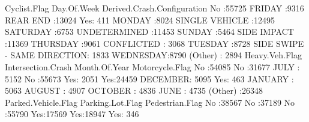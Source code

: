 \documentclass[11pt, a4paper]{article}
\begin{document}
\begin{Schunk}
\begin{Soutput}
 Cyclist.Flag    Day.Of.Week                Derived.Crash.Configuration
 No :55725    FRIDAY   :9316   REAR END                   :13024       
 Yes:  411    MONDAY   :8024   SINGLE VEHICLE             :12495       
              SATURDAY :6753   UNDETERMINED               :11453       
              SUNDAY   :5464   SIDE IMPACT                :11369       
              THURSDAY :9061   CONFLICTED                 : 3068       
              TUESDAY  :8728   SIDE SWIPE - SAME DIRECTION: 1833       
              WEDNESDAY:8790   (Other)                    : 2894       
 Heavy.Veh.Flag Intersection.Crash  Month.Of.Year   Motorcycle.Flag
 No :54085      No :31677          JULY    : 5152   No :55673      
 Yes: 2051      Yes:24459          DECEMBER: 5095   Yes:  463      
                                   JANUARY : 5063                  
                                   AUGUST  : 4907                  
                                   OCTOBER : 4836                  
                                   JUNE    : 4735                  
                                   (Other) :26348                  
 Parked.Vehicle.Flag Parking.Lot.Flag Pedestrian.Flag
 No :38567           No :37189        No :55790      
 Yes:17569           Yes:18947        Yes:  346      
                                                     
                                                     
                                                     
                                                     
                                                     

\end{Soutput}
\end{Schunk}
\end{document}
